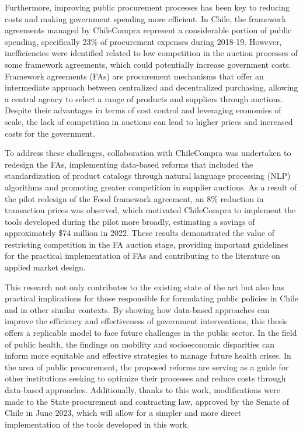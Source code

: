 \begin{intro}
    Furthermore, improving public procurement processes has been key to reducing costs and making government spending more efficient. In Chile, the framework agreements managed by ChileCompra represent a considerable portion of public spending, specifically 23\% of procurement expenses during 2018-19. However, inefficiencies were identified related to low competition in the auction processes of some framework agreements, which could potentially increase government costs. Framework agreements (FAs) are procurement mechanisms that offer an intermediate approach between centralized and decentralized purchasing, allowing a central agency to select a range of products and suppliers through auctions. Despite their advantages in terms of cost control and leveraging economies of scale, the lack of competition in auctions can lead to higher prices and increased costs for the government.
    
    To address these challenges, collaboration with ChileCompra was undertaken to redesign the FAs, implementing data-based reforms that included the standardization of product catalogs through natural language processing (NLP) algorithms and promoting greater competition in supplier auctions. As a result of the pilot redesign of the Food framework agreement, an 8\% reduction in transaction prices was observed, which motivated ChileCompra to implement the tools developed during the pilot more broadly, estimating a savings of approximately \$74 million in 2022. These results demonstrated the value of restricting competition in the FA auction stage, providing important guidelines for the practical implementation of FAs and contributing to the literature on applied market design.
    
    This research not only contributes to the existing state of the art but also has practical implications for those responsible for formulating public policies in Chile and in other similar contexts. By showing how data-based approaches can improve the efficiency and effectiveness of government interventions, this thesis offers a replicable model to face future challenges in the public sector. In the field of public health, the findings on mobility and socioeconomic disparities can inform more equitable and effective strategies to manage future health crises. In the area of public procurement, the proposed reforms are serving as a guide for other institutions seeking to optimize their processes and reduce costs through data-based approaches. Additionally, thanks to this work, modifications were made to the State procurement and contracting law, approved by the Senate of Chile in June 2023, which will allow for a simpler and more direct implementation of the tools developed in this work.
    

\end{intro}

